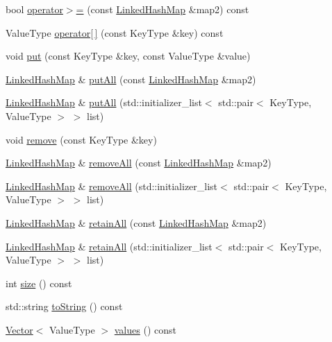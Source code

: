 \begin{DoxyCompactItemize}
\item 
bool \mbox{\hyperlink{classLinkedHashMap_a10dcd6f0ad26dff43ab6f4873243a449}{operator$>$=}} (const \mbox{\hyperlink{classLinkedHashMap}{Linked\+Hash\+Map}} \&map2) const
\item 
Value\+Type \mbox{\hyperlink{classLinkedHashMap_a9f52896b148cfbbc16e12ad1008971b1}{operator\mbox{[}$\,$\mbox{]}}} (const Key\+Type \&key) const
\item 
void \mbox{\hyperlink{classLinkedHashMap_af0d1d70a37332cb3054fe5b1b170927c}{put}} (const Key\+Type \&key, const Value\+Type \&value)
\item 
\mbox{\hyperlink{classLinkedHashMap}{Linked\+Hash\+Map}} \& \mbox{\hyperlink{classLinkedHashMap_a6a0e6f4c23d4e1e470e793b19ab62b52}{put\+All}} (const \mbox{\hyperlink{classLinkedHashMap}{Linked\+Hash\+Map}} \&map2)
\item 
\mbox{\hyperlink{classLinkedHashMap}{Linked\+Hash\+Map}} \& \mbox{\hyperlink{classLinkedHashMap_a8cb591b953a8e479b178b4ed111f39e8}{put\+All}} (std\+::initializer\+\_\+list$<$ std\+::pair$<$ Key\+Type, Value\+Type $>$ $>$ list)
\item 
void \mbox{\hyperlink{classLinkedHashMap_ac6e7e5198a9f1c8b2cc40fbd1d0eb3b0}{remove}} (const Key\+Type \&key)
\item 
\mbox{\hyperlink{classLinkedHashMap}{Linked\+Hash\+Map}} \& \mbox{\hyperlink{classLinkedHashMap_a192b64f541a02885811d43505ac99d6f}{remove\+All}} (const \mbox{\hyperlink{classLinkedHashMap}{Linked\+Hash\+Map}} \&map2)
\item 
\mbox{\hyperlink{classLinkedHashMap}{Linked\+Hash\+Map}} \& \mbox{\hyperlink{classLinkedHashMap_aa3c3540443fba343b0e8ecfea1ce14b1}{remove\+All}} (std\+::initializer\+\_\+list$<$ std\+::pair$<$ Key\+Type, Value\+Type $>$ $>$ list)
\item 
\mbox{\hyperlink{classLinkedHashMap}{Linked\+Hash\+Map}} \& \mbox{\hyperlink{classLinkedHashMap_a9bcc3af0a0717671f5bf22f2c886f7ff}{retain\+All}} (const \mbox{\hyperlink{classLinkedHashMap}{Linked\+Hash\+Map}} \&map2)
\item 
\mbox{\hyperlink{classLinkedHashMap}{Linked\+Hash\+Map}} \& \mbox{\hyperlink{classLinkedHashMap_a536d98ab557dfbb13f9b7c712f45243f}{retain\+All}} (std\+::initializer\+\_\+list$<$ std\+::pair$<$ Key\+Type, Value\+Type $>$ $>$ list)
\item 
int \mbox{\hyperlink{classLinkedHashMap_af9593d4a5ff4274efaf429cb4f9e57cc}{size}} () const
\item 
std\+::string \mbox{\hyperlink{classLinkedHashMap_a1fe5121d6528fdea3f243321b3fa3a49}{to\+String}} () const
\item 
\mbox{\hyperlink{classVector}{Vector}}$<$ Value\+Type $>$ \mbox{\hyperlink{classLinkedHashMap_a50ccbe4184324f0da975648a12728d20}{values}} () const
\end{DoxyCompactItemize}


